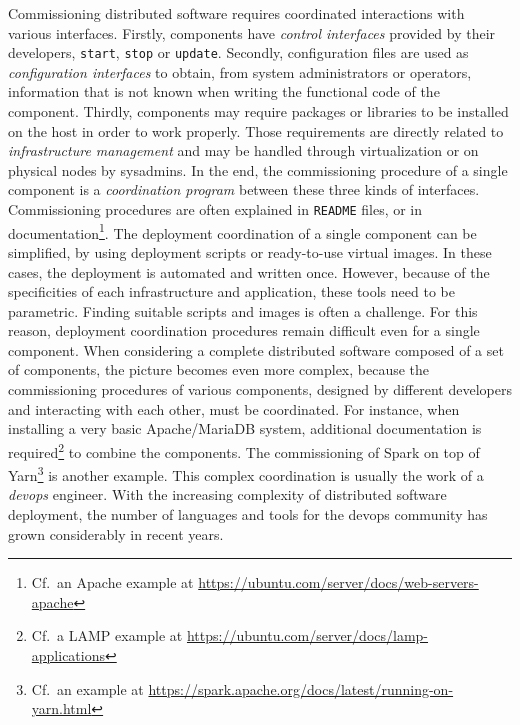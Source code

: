 Commissioning distributed software requires coordinated interactions
with various interfaces. Firstly, components have \emph{control
  interfaces} provided by their developers, \eg \texttt{start},
\texttt{stop} or \texttt{update}. Secondly, configuration files are
used as \emph{configuration interfaces} to obtain, from system
administrators or operators, information that is not known when
writing the functional code of the component. Thirdly, components may
require packages or libraries to be installed on the host in order
to work properly. Those requirements are directly related to
\emph{infrastructure management} and may be handled through
virtualization or on physical nodes by sysadmins.
%
In the end, the commissioning procedure of a single component is a
\emph{coordination program} between these three kinds of
interfaces. Commissioning procedures are often explained in
\texttt{README} files, or in
documentation\footnote{Cf.\ an Apache example at \url{https://ubuntu.com/server/docs/web-servers-apache}}. The
deployment coordination of a single component can be simplified, \eg
by using deployment scripts or ready-to-use virtual images. In these
cases, the deployment is automated and written once. However, because
of the specificities of each infrastructure and application, these
tools need to be parametric. Finding suitable scripts and images is
often a challenge. For this reason, deployment coordination procedures
remain difficult even for a single component.
%
When considering a complete distributed software composed of a set of
components, the picture becomes even more complex, because the
commissioning procedures of various components, designed by different
developers and interacting with each other, must be coordinated. For
instance, when installing a very basic Apache/MariaDB system,
additional documentation is
required\footnote{Cf.\ a LAMP     example at \url{https://ubuntu.com/server/docs/lamp-applications}} to combine the
components. The commissioning of Spark on top of
Yarn\footnote{Cf.\ an example at \url{https://spark.apache.org/docs/latest/running-on-yarn.html}}
is another example.
%
This complex coordination is usually the work of a \emph{devops}
engineer. With the increasing complexity of distributed software
deployment, the number of languages and tools for the devops community
has grown considerably in recent years.

